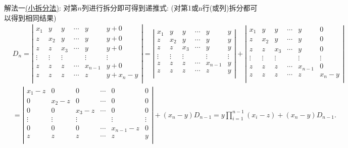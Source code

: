 \documentclass[../../main.tex]{subfiles}%
\begin{document}
\begin{solution}

{\color{blue}解法一\hyperref[小拆分法]{(小拆分法)}:}
对第$n$列进行拆分即可得到递推式:
(对第1或n行(或列)拆分都可以得到相同结果)
\begin{align}
&D_n=\left| \begin{matrix}
x_1&		y&		y&		\cdots&		y&		y+0\\
z&		x_2&		y&		\cdots&		y&		y+0\\
z&		z&		x_3&		\cdots&		y&		y+0\\
\vdots&		\vdots&		\vdots&		&		\vdots&		\vdots\\
z&		z&		z&		\cdots&		x_{n-1}&		y+0\\
z&		z&		z&		\cdots&		z&		y+x_n-y\\
\end{matrix} \right|=\left| \begin{matrix}
x_1&		y&		y&		\cdots&		y&		y\\
z&		x_2&		y&		\cdots&		y&		y\\
z&		z&		x_3&		\cdots&		y&		y\\
\vdots&		\vdots&		\vdots&		&		\vdots&		\vdots\\
z&		z&		z&		\cdots&		x_{n-1}&		y\\
z&		z&		z&		\cdots&		z&		y\\
\end{matrix} \right|+\left| \begin{matrix}
x_1&		y&		y&		\cdots&		y&		0\\
z&		x_2&		y&		\cdots&		y&		0\\
z&		z&		x_3&		\cdots&		y&		0\\
\vdots&		\vdots&		\vdots&		&		\vdots&		\vdots\\
z&		z&		z&		\cdots&		x_{n-1}&		0\\
z&		z&		z&		\cdots&		z&		x_n-y\\
\end{matrix} \right|
\nonumber\\
&=\left| \begin{matrix}
x_1-z&		0&		0&		\cdots&		0&		0\\
0&		x_2-z&		0&		\cdots&		0&		0\\
0&		0&		x_3-z&		\cdots&		0&		0\\
\vdots&		\vdots&		\vdots&		&		\vdots&		\vdots\\
0&		0&		0&		\cdots&		x_{n-1}-z&		0\\
z&		z&		z&		\cdots&		z&		y\\
\end{matrix} \right|+\left( x_n-y \right) D_{n-1}=y\prod\limits_{i=1}^{n-1}{\left( x_i-z \right)}+\left( x_n-y \right) D_{n-1}.

\end{align}
\end{solution}
\end{document}

